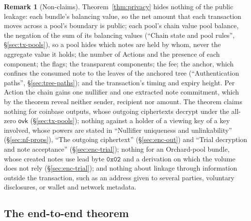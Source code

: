 \documentclass[11pt,a4paper]{article}
\theoremstyle{definition}
\newtheorem{remark}[theorem]{Remark}
\newcommand{\ovk}{\ensuremath{\mathsf{ovk}}}
\begin{document}
\begin{remark}[Non-claims]
Theorem~\ref{thm:privacy} hides nothing of the public leakage: each
bundle's balancing value, so the net amount that each transaction moves
across a pool's boundary is public; each pool's chain value pool balance,
the negation of the sum of its balancing values (``Chain state and pool
rules'', \S\ref{sec:tx-pools}), so a pool hides which notes are held by
whom, never the aggregate value it holds; the number of Actions and the
presence of each component; the flags; the transparent components; the fee;
the anchor, which confines the consumed note to the leaves of the anchored
tree (``Authentication paths'', \S\ref{sec:tree-paths}); and the
transaction's timing and expiry height. Per Action the chain gains one
nullifier and one extracted note commitment, which by the theorem reveal
neither sender, recipient nor amount. The theorem claims nothing for
coinbase outputs, whose outgoing ciphertexts decrypt under the all-zero
$\ovk$ (\S\ref{sec:tx-pools}); nothing against a holder of a viewing key of
a key involved, whose powers are stated in ``Nullifier uniqueness and
unlinkability'' (\S\ref{sec:nf-props}), ``The outgoing ciphertext''
(\S\ref{sec:enc-out}) and ``Trial decryption and note acceptance''
(\S\ref{sec:enc-trial}); nothing for an Orchard-pool bundle, whose created
notes use lead byte $\mathtt{0x02}$ and a derivation on which the volume
does not rely (\S\ref{sec:enc-trial}); and nothing about linkage through
information outside the transaction, such as an address given to several
parties, voluntary disclosures, or wallet and network metadata.
\end{remark}

\subsection{The end-to-end theorem}\label{sec:security-e2e}
\end{document}
